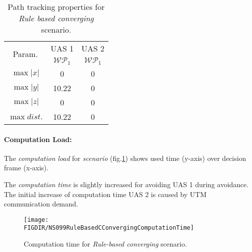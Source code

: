 \begin{table}[H]
    \centering
    \begin{tabular}{c||c|c}
        \multirow{2}{*}{Param.} & UAS 1     & UAS 2              \\\cline{2-3}
                        & $\mathscr{WP}_1$  & $\mathscr{WP}_1$   \\\hline\hline
          $\max |x|$    & 0                 & 0                  \\\hline
          $\max |y|$    & 10.22             & 0                  \\\hline
          $\max |z|$    & 0                 & 0                  \\\hline
          $\max dist.$  & 10.22             & 0                  \\
    \end{tabular}
    \caption{Path tracking properties for \emph{Rule based converging} scenario.}
    \label{tab:pathTrackingParametersForRuleBasedConverging}
\end{table}

\paragraph{Computation Load:} The \emph{computation load} for \emph{scenario} (fig.\ref{fig:ruleBasedCConvergingComputationTime}) shows used time (y-axis) over decision frame (x-axis).

The \emph{computation time} is slightly increased for avoiding UAS 1 during avoidance. The initial increase of computation time UAS 2 is caused by UTM communication demand.

\begin{figure}[H]
    \centering
    \texttt{[image: \\FIGDIR/NS099RuleBasedCConvergingComputationTime]} 
    \caption{Computation time for \emph{Rule-based converging} scenario.}
    \label{fig:ruleBasedCConvergingComputationTime}
\end{figure}